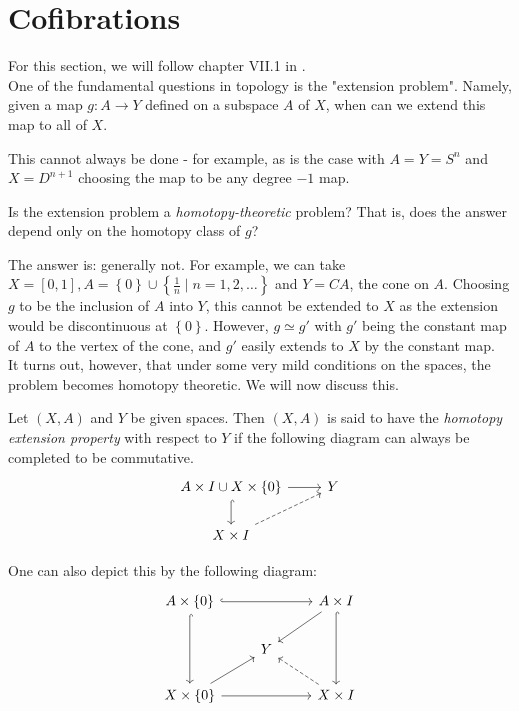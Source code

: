 \section{Cofibrations}
For this section, we will follow chapter VII.1 in \cite{Bredon}.\\
\linebreak
One of the fundamental questions in topology is the
"extension problem". Namely, given a map
$g \colon A \to Y$ defined on a subspace $A$ of $X$, when
can we extend this map to all of $X$.

This cannot always be done - for example, as is the case
with $A = Y = S^{n}$ and $X = D^{n+1}$ choosing the
map to be any degree $-1$ map.\\
\linebreak
\begin{question}
    Is the extension problem a \textit{homotopy-theoretic} problem?
    That is, does the answer depend only on the homotopy
    class of $g$?
\end{question}
The answer is: generally not. 
For example, we can take $X = \left[ 0,1 \right] ,
A = \left\{ 0 \right\} \cup \left\{ \frac{1}{n} \mid 
n=1, 2, \ldots \right\} $ and $Y = CA$, the cone
on $A$. Choosing $g$ to be the inclusion of
$A$ into $Y$, this cannot be extended to $X$ as the
extension would be discontinuous at $\left\{ 0 \right\} $.
However, $g \simeq g'$ with $g'$ being the constant
map of $A$ to the vertex of the cone, and $g'$ easily
extends to $X$ by the constant map.\\
\linebreak
It turns out, however, that under some very mild conditions
on the spaces, the problem becomes homotopy theoretic. 
We will now discuss this.

\begin{definition}
    Let $\left( X,A \right) $ and $Y $ be given spaces.
    Then $\left( X, A \right) $ is said to have
    the \textit{homotopy extension property} with respect to
    $Y$ if the following diagram can always be completed
    to be commutative.
    \begin{equation*}
    \begin{tikzcd}
        A \times I \cup X \times \left\{ 0 \right\} 
        \ar[r] \ar[d, hookrightarrow] & Y\\
        X \times I \ar[ru, dashed]
    \end{tikzcd}
    \end{equation*}

    One can also depict this by the following diagram:
    \begin{equation*}
    \begin{tikzcd}
        A \times \left\{ 0 \right\} \ar[rr, hookrightarrow]
        \ar[dd, hookrightarrow] 
        & & A \times I \ar[dd, hookrightarrow] \ar[ld] \\
        & Y & \\
        X \times \left\{ 0 \right\} \ar[ru] \ar[rr] && X \times I
        \ar[lu, dashed]
    \end{tikzcd}
    \end{equation*}
\end{definition}

